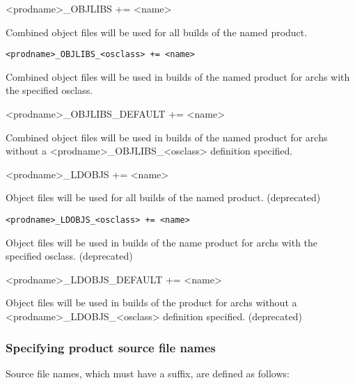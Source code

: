 \begin{description}
\item

\item \textless{}prodname\textgreater{}\_OBJLIBS += \textless{}name\textgreater{}

Combined object files will be used for all builds of the named product.

\item \verb|<prodname>_OBJLIBS_<osclass> += <name>| 

Combined object files will be used in builds of the named product for archs with the specified osclass.

\item \textless{}prodname\textgreater{}\_OBJLIBS\_DEFAULT += \textless{}name\textgreater{}

Combined object files will be used in builds of the named product for archs without a 
\textless{}prodname\textgreater{}\_OBJLIBS\_\textless{}osclass\textgreater{} definition specified.



\item \textless{}prodname\textgreater{}\_LDOBJS += \textless{}name\textgreater{}

Object files will be used for all builds of the named product. (deprecated)

\item \verb|<prodname>_LDOBJS_<osclass> += <name>| 

Object files will be used in builds of the name product for archs with the specified osclass. (deprecated)

\item \textless{}prodname\textgreater{}\_LDOBJS\_DEFAULT += \textless{}name\textgreater{}

Object files will be used in builds of the product for archs without a \textless{}prodname\textgreater{}\_LDOBJS\_\textless{}osclass\textgreater{} 
definition specified. (deprecated)

\end{description}

\subsubsection{Specifying product source file names}

Source file names, which must have a suffix, are defined as follows:

